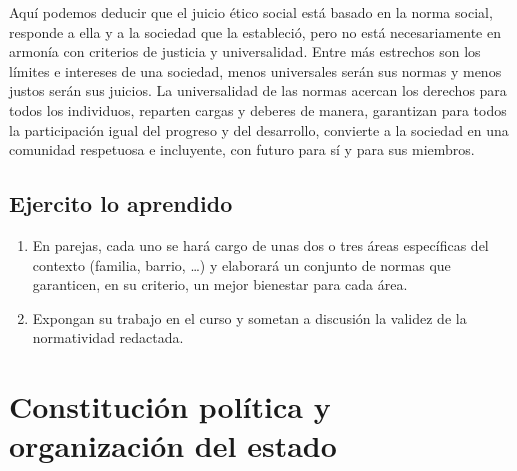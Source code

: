 \documentclass[10pt,twoside]{article}
\begin{document}
Aquí podemos deducir que el juicio ético social está basado en
la norma social, responde a ella y a la sociedad que la estableció, pero no está necesariamente en armonía con criterios de justicia y universalidad. Entre más estrechos son los límites e intereses de una sociedad, menos universales serán sus normas y menos justos serán sus juicios. La universalidad de las normas acercan los derechos para todos
los individuos, reparten cargas y deberes de manera, garantizan para todos la participación igual del progreso y del desarrollo, convierte a la sociedad en una comunidad respetuosa e incluyente, con futuro para sí y para sus miembros.
\subsection{Ejercito lo aprendido}
\begin{enumerate}
\item En parejas, cada uno se har\'{a} cargo de unas dos o tres áreas específicas del contexto (familia, barrio, \ldots) y elaborará un conjunto de normas que garanticen, en su criterio, un mejor bienestar para cada \'{a}rea.
\item Expongan su trabajo en el curso y sometan a discusi\'{o}n la validez de la normatividad redactada.
\end{enumerate}
\section{Constituci\'{o}n pol\'{i}tica y organizaci\'{o}n del estado}
\end{document}
